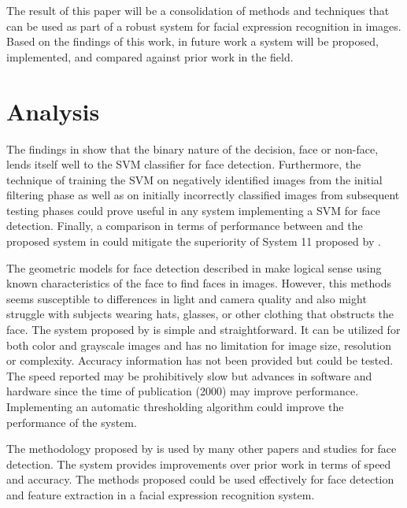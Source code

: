 \documentclass{IEEEtran}
\begin{document}
The result of this paper will be a consolidation of methods and techniques that can be used as part of a robust system for facial expression recognition in images. Based on the findings of this work, in future work a system will be proposed, implemented, and compared against prior work in the field.







\section{Analysis}

 The findings in \cite{ai2001face} show that the binary nature of the decision, face or non-face, lends itself well to the SVM classifier for face detection. Furthermore, the technique of training the SVM on negatively identified images from the initial filtering phase as well as on initially incorrectly classified images from subsequent testing phases could prove useful in any system implementing a SVM for face detection. Finally, a comparison in terms of performance between \cite{rowley1998nn} and the proposed system in \cite{ai2001face} could mitigate the superiority of System 11 proposed by \cite{rowley1998nn}.
 
 The geometric models for face detection described in \cite{lin2000human} make logical sense using known characteristics of the face to find faces in images. However, this methods seems susceptible to differences in light and camera quality and also might struggle with subjects wearing hats, glasses, or other clothing that obstructs the face. The system proposed by \cite{lin2000human} is simple and straightforward. It can be utilized for both color and grayscale images and has no limitation for image size, resolution or complexity. Accuracy information has not been provided but could be tested. The speed reported may be prohibitively slow but advances in software and hardware since the time of publication (2000) may improve performance. Implementing an automatic thresholding algorithm could improve the performance of the system.


The methodology proposed by \cite{viola2004robust} is used by many other papers and studies for face detection. The system provides improvements over prior work in terms of speed and accuracy. The methods proposed could be used effectively for face detection and feature extraction in a facial expression recognition system.
\end{document}
